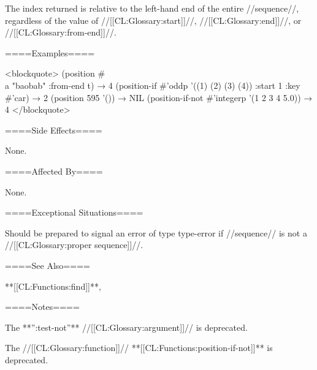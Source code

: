The index returned is relative to the left-hand end of the entire //sequence//, regardless of the value of //[[CL:Glossary:start]]//, //[[CL:Glossary:end]]//, or //[[CL:Glossary:from-end]]//.

====Examples====

<blockquote> (position #\\a "baobab" :from-end t) → 4 (position-if #'oddp '((1) (2) (3) (4)) :start 1 :key #'car) → 2 (position 595 '()) → NIL (position-if-not #'integerp '(1 2 3 4 5.0)) → 4 </blockquote>

====Side Effects====

None.

====Affected By====

None.

====Exceptional Situations====

Should be prepared to signal an error of type type-error if //sequence// is not a //[[CL:Glossary:proper sequence]]//.

====See Also====

**[[CL:Functions:find]]**,

{\secref\TraversalRules}

====Notes====

The **'':test-not''** //[[CL:Glossary:argument]]// is deprecated.

The //[[CL:Glossary:function]]// **[[CL:Functions:position-if-not]]** is deprecated.



    
